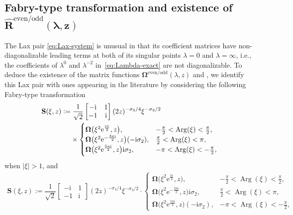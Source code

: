 \documentclass[11pt]{article}
\numberwithin{equation}{section}
\numberwithin{equation}{section}
\newcommand{\ee}{\mathrm{e}}
\newcommand{\ii}{\mathrm{i}}
\renewcommand{\arg}{\operatorname{Arg}}
\begin{document}
\subsection[Fabry-type transformation and existence of Rhateven/odd(lambda,z)]{Fabry-type transformation and existence of $\boldsymbol{\widehat{R}^\mathrm{even/odd}(\lambda,z)}$} \label{sec:suleimanov-solution-connection}
The Lax pair \eqref{eq:Lax-system} is unusual in that its coefficient matrices have non-diagonalizable leading terms at both of its singular points $\lambda = 0$ and $\lambda = \infty$, i.e., the coefficients of $\lambda^0$ and $\lambda^{-2}$ in~\eqref{eq:Lambda-exact} are not diagonalizable. To deduce the existence of the matrix functions ${\mathbf{\Omega}}^{\mathrm{even/odd}}(\lambda, z)$ and , we identify this Lax pair with ones appearing in the literature by considering the following Fabry-type transformation
\begin{align}
&\mathbf{S}(\xi, z) := {\dfrac{1}{\sqrt{2}}} \begin{bmatrix} -\ii & 1\\ -1 &\ii \end{bmatrix} (2z)^{-\sigma_3/4} \xi^{-\sigma_3/2}\nonumber
\\
&\hphantom{\mathbf{S}(\xi, z) :=}{}
\times \begin{cases}
\mathbf \Omega\big(\xi^2 \ee^{\frac{\ii\pi}{2}}, z\big),& -\frac{\pi}{2}<\arg(\xi)<\frac{\pi}{2},\\
\mathbf \Omega\big(\xi^2 \ee^{-\frac{3\pi \ii}{2}}, z\big)(-\ii\sigma_2),& \frac{\pi}{2}<\arg(\xi)<\pi, \\
\mathbf \Omega\big(\xi^2 \ee^{\frac{5\pi \ii}{2}}, z\big)\ii\sigma_2,& -\pi<\arg(\xi)<-\frac{\pi}{2},
 \end{cases}
 \label{eq:fabry-1}
\end{align}
when $|\xi|>1$, and
\begin{gather}
\mathbf{S}(\xi, z) := {\dfrac{1}{\sqrt{2}}} \begin{bmatrix} -\ii & 1\\ -1 &\ii \end{bmatrix} (2z)^{-\sigma_3/4} \xi^{-\sigma_3/2}
\cdot \begin{cases}
\mathbf \Omega\big(\xi^2 \ee^{\frac{\ii\pi}{2}}, z\big),& -\frac{\pi}{2}<\arg(\xi)<\frac{\pi}{2},\\
\mathbf \Omega\big(\xi^2 \ee^{-\frac{3\pi \ii}{2}}, z\big)\ii\sigma_2,& \frac{\pi}{2}<\arg(\xi)<\pi, \\
\mathbf \Omega\big(\xi^2 \ee^{\frac{5\pi \ii}{2}}, z\big)(-\ii\sigma_2),& -\pi<\arg(\xi)<-\frac{\pi}{2},
 \end{cases}\!\!\!\!
 \label{eq:fabry-2}
\end{gather}
\end{document}
